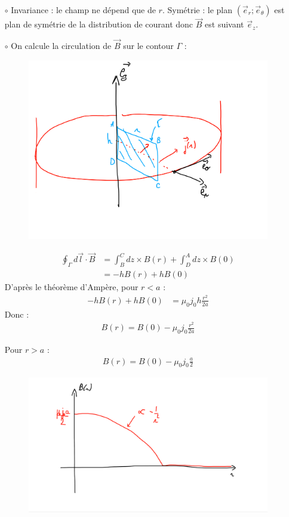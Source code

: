 \documentclass{report}
\begin{document}
\begin{itemize}

	\item[$\circ$] Invariance : le champ ne dépend que de $r$. Symétrie : le plan $(\vec{e}_r ;\vec{e}_\theta)$ est plan de symétrie de la distribution de courant donc $\vec{B}$ est suivant $\vec{e}_z$.
	
	\item[$\circ$] On calcule la circulation de $\vec{B}$ sur le contour $\Gamma$ :
	\begin{figure}[h!]
	\centering
		\includegraphics[scale=0.25]{orthoradial.pdf}
	\end{figure}
	\begin{align*}
		\oint_\Gamma d\vec{l}\cdot\vec{B}&=\int_B^Cdz\times B(r)+\int_D^Adz\times B(0) \\
		&=-hB(r)+hB(0)
	\end{align*}	 
	D'après le théorème d'Ampère, pour $r<a$ :
	\begin{align}
		-hB(r)+hB(0)&=\mu_0j_0h\frac{r^2}{2a}
	\end{align}
	Donc :
	\begin{align*}
		B(r) = B(0)-\mu_0j_0\frac{r^2}{2a}
	\end{align*}
	
	Pour $r>a$ :
	\begin{align*}
		B(r) = B(0)-\mu_0j_0\frac{a}{2}
	\end{align*}	

	\begin{figure}[h!]
	\centering
		\includegraphics[scale=0.25]{orthoradial2.pdf}
	\end{figure}
	

\end{itemize}
\end{document}
